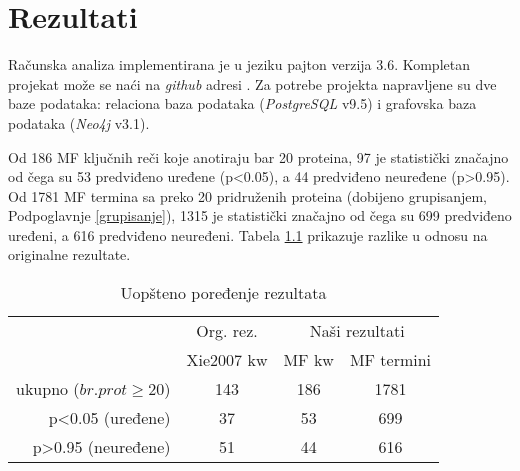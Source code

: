 
\chapter{Rezultati} %

\label{Rezultati} %

Računska analiza implementirana je u jeziku pajton  verzija 3.6.
Kompletan projekat može se naći na \textit{github} adresi \cite{projekat}. Za
potrebe projekta napravljene su dve baze podataka: relaciona baza podataka
(\textit{PostgreSQL} v9.5) i grafovska baza podataka (\textit{Neo4j} v3.1).

Od 186 MF ključnih reči koje anotiraju bar 20 proteina, 97 je statistički
značajno od čega su 53 predviđeno uređene (p<0.05), a 44 predviđeno neuređene
(p>0.95).  Od 1781 MF termina sa preko 20 pridruženih proteina (dobijeno
grupisanjem, Podpoglavnje \ref{grupisanje}), 1315 je statistički značajno od
čega su 699 predviđeno uređeni, a 616 predviđeno neuređeni.  Tabela
\ref{tab:kw_uopsteno} prikazuje razlike u odnosu na originalne rezultate.

\begin{table}[htpb]
\begin{tabular}{|r|c|c|c|}
  \hline
                     & Org. rez.  & \multicolumn{2}{c|}{ Naši rezultati} \\
                     & Xie2007 kw & MF kw  & MF termini                  \\
  \hline
  ukupno ($br. prot\ge20$)     & 143        & 186    & 1781                        \\
  p<0.05 (uređene)   & 37         & 53     & 699                         \\
  p>0.95 (neuređene) & 51         & 44     & 616                         \\
  \hline
\end{tabular}
  \centering
  \caption{Uopšteno poređenje rezultata}
  \label{tab:kw_uopsteno}
\end{table}

